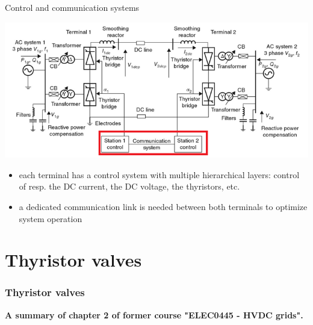 \begin{frame}{Control and communication systems}
\begin{center}
    \includegraphics[width=0.5\linewidth]{images/typical-HVDC6.png}
\end{center}
\begin{itemize}
    \item each terminal has a control system with multiple hierarchical layers: control of resp. the DC current, the DC voltage, the thyristors, etc.
    \item a dedicated communication link is needed between both terminals to optimize system operation
\end{itemize}
\end{frame}



\section{Thyristor valves}

\begin{frame}[fragile]
\frametitle{Thyristor valves}
\begin{center}
\textbf{A summary of chapter 2 of former course "ELEC0445 - HVDC grids".}
\end{center}
\end{frame}

